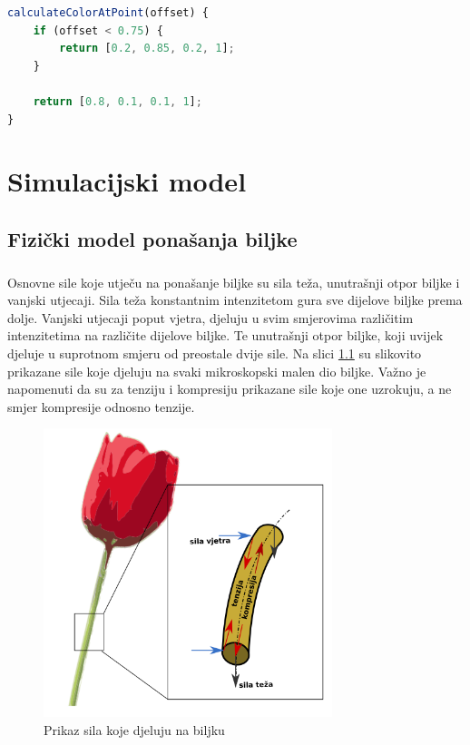\documentclass[times, utf8, diplomski]{fer}
\begin{document}
\begin{lstlisting}[language=Javascript,caption=Dodavanje boja modelu,label=code25-4]
calculateColorAtPoint(offset) {
	if (offset < 0.75) {
		return [0.2, 0.85, 0.2, 1];
	}

	return [0.8, 0.1, 0.1, 1];
}
\end{lstlisting}


\chapter{Simulacijski model}
\section{Fizički model ponašanja biljke}
\paragraph{}
Osnovne sile koje utječu na ponašanje biljke su sila teža, unutrašnji otpor 
biljke i vanjski utjecaji. Sila teža konstantnim intenzitetom gura sve dijelove 
biljke prema dolje. Vanjski utjecaji poput vjetra, djeluju u svim smjerovima 
različitim intenzitetima na različite dijelove biljke. Te unutrašnji otpor 
biljke, koji uvijek djeluje u suprotnom smjeru od preostale dvije sile. Na 
slici \ref{fig:31-1} su slikovito prikazane sile koje djeluju na svaki mikroskopski malen 
dio biljke. Važno je napomenuti da su za tenziju i kompresiju prikazane sile koje one 
uzrokuju, a ne smjer kompresije odnosno tenzije.

\begin{figure}[h]
	\centering
	\includegraphics[width=0.75\textwidth]{img/31-1}
	\caption{Prikaz sila koje djeluju na biljku}
	\label{fig:31-1}
\end{figure}
\end{document}
